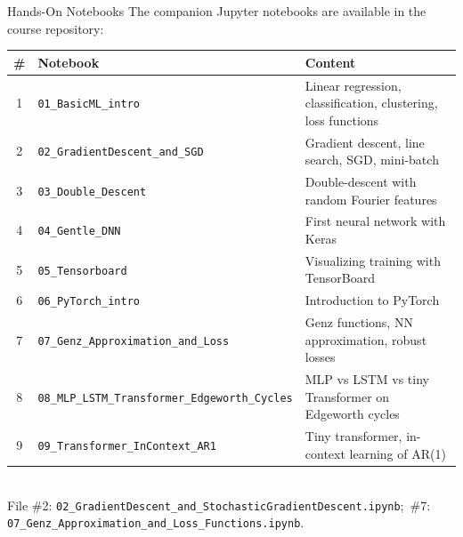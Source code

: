 \documentclass[aspectratio=169,11pt]{beamer}
\begin{document}
\begin{frame}[shrink=15]{Hands-On Notebooks}
The companion Jupyter notebooks are available in the course repository:

\vspace{0.3cm}
\begin{center}
{\scriptsize
\renewcommand{\arraystretch}{1.15}
\begin{tabular}{clp{5.2cm}}
\toprule
\textbf{\#} & \textbf{Notebook} & \textbf{Content} \\
\midrule
1 & \texttt{01\_BasicML\_intro} & Linear regression, classification, clustering, loss functions \\
2 & \texttt{02\_GradientDescent\_and\_SGD} & Gradient descent, line search, SGD, mini-batch \\
3 & \texttt{03\_Double\_Descent} & Double-descent with random Fourier features \\
4 & \texttt{04\_Gentle\_DNN} & First neural network with Keras \\
5 & \texttt{05\_Tensorboard} & Visualizing training with TensorBoard \\
6 & \texttt{06\_PyTorch\_intro} & Introduction to PyTorch \\
7 & \texttt{07\_Genz\_Approximation\_and\_Loss} & Genz functions, NN approximation, robust losses \\
8 & \texttt{08\_MLP\_LSTM\_Transformer\_Edgeworth\_Cycles} & MLP vs LSTM vs tiny Transformer on Edgeworth cycles \\
9 & \texttt{09\_Transformer\_InContext\_AR1} & Tiny transformer, in-context learning of AR(1) \\
\bottomrule
\end{tabular}
\vspace{0.2cm}\\
{\tiny File \#2: \texttt{02\_GradientDescent\_and\_StochasticGradientDescent.ipynb};\ \#7: \texttt{07\_Genz\_Approximation\_and\_Loss\_Functions.ipynb}.}
}%
\end{center}
\end{frame}
\end{document}
